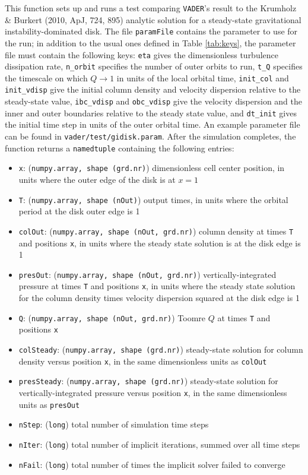\documentclass[12pt]{article}
\newcommand{\vader}{\texttt{VADER}}
\begin{document}
This function sets up and runs a test comparing \vader's result to the Krumholz \& Burkert (2010, ApJ, 724, 895) analytic solution for a steady-state gravitational instability-dominated disk. The file \texttt{paramFile} contains the parameter to use for the run; in addition to the usual ones defined in Table \ref{tab:keys}, the parameter file must contain the following keys: \verb=eta= gives the dimensionless turbulence dissipation rate, \verb=n_orbit= specifies the number of outer orbits to run, \verb=t_Q= specifies the timescale on which $Q\rightarrow 1$ in units of the local orbital time, \verb=init_col= and \verb=init_vdisp= give the initial column density and velocity dispersion relative to the steady-state value, \verb=ibc_vdisp= and \verb=obc_vdisp= give the velocity dispersion and the inner and outer boundaries relative to the steady state value, and \verb=dt_init= gives the initial time step in units of the outer orbital time. An example parameter file can be found in \verb=vader/test/gidisk.param=. After the simulation completes, the function returns a \verb=namedtuple= containing the following entries:
\begin{itemize}
\item \texttt{x}: (\texttt{numpy.array, shape (grd.nr)}) dimensionless cell center position, in units where the outer edge of the disk is at $x=1$
\item \texttt{T}: (\texttt{numpy.array, shape (nOut)}) output times, in units where the orbital period at the disk outer edge is 1
\item \texttt{colOut}: (\texttt{numpy.array, shape (nOut, grd.nr)}) column density at times \verb=T= and positions \verb=x=,  in units where the steady state solution is at the disk edge is 1
\item \texttt{presOut}: (\texttt{numpy.array, shape (nOut, grd.nr)}) vertically-integrated pressure at times \verb=T= and positions \verb=x=,  in units where the steady state solution for the column density times velocity dispersion squared at the disk edge is 1
\item \texttt{Q}: (\texttt{numpy.array, shape (nOut, grd.nr)}) Toomre $Q$ at times \verb=T= and positions \verb=x=
\item \texttt{colSteady}: (\texttt{numpy.array, shape (grd.nr)}) steady-state solution for column density versus position \verb=x=, in the same dimensionless units as \verb=colOut=
\item \texttt{presSteady}: (\texttt{numpy.array, shape (grd.nr)}) steady-state solution for vertically-integrated pressure versus position \verb=x=, in the same dimensionless units as \verb=presOut=
\item \texttt{nStep}: (\texttt{long}) total number of simulation time steps
\item \texttt{nIter}: (\texttt{long}) total number of implicit iterations, summed over all time steps
\item \texttt{nFail}: (\texttt{long}) total number of times the implicit solver failed to converge
\end{itemize}
\end{document}

